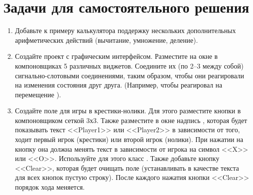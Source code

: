 \section[Задачи для самостоятельного решения]{Задачи для самостоятельного решения}
\begin{enumerate}
\item Добавьте к примеру калькулятора поддержку нескольких дополнительных арифметических действий (вычитание, умножение,
деление). 
\item Создайте проект с графическим интерфейсом. Разместите на окне в компоновщиках 5 различных виджетов. Соедините их
(по 2--3 между собой) сигнально-слотовыми соединениями, таким образом, чтобы они реагировали на изменения состояния друг
друга. (Например, чтобы  реагировал на перемещение ).
\item Создайте поле для игры в крестики-нолики.
Для этого разместите кнопки в компоновщиком  сеткой 3х3. Также разместите в окне
надпись , которая будет показывать текст <<Player1>> или <<Player2>> в зависимости от того, ходит первый игрок
(крестики) или второй игрок (нолики). При нажатии на кнопку она должна менять текст в зависимости от игрока на символ
<<X>> или <<O>>. Используйте для этого класс . Также добавьте кнопку <<Clear>>, которая будет очищать поле
(устанавливать в качестве текста для всех кнопок пустую строку). После каждого нажатия кнопки <<Clear>> порядок хода
меняется.
\end{enumerate}
